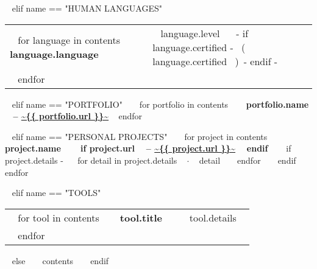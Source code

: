 ~{ elif name == "HUMAN LANGUAGES" }~
  \begin{tabular}{ @{} p{32mm} p{135mm} @{} }
  ~{ for language in contents }~
    \bf {~{{ language.language }}~} & {\small ~{{ language.level }}~ ~{- if language.certified -}~ \small\color{maingrey}\hspace{1mm}(~{{ language.certified }}~)~{- endif -}~} \\
  ~{ endfor }~
  \end{tabular}
  \vspace{50mm}

~{ elif name == "PORTFOLIO" }~
  ~{ for portfolio in contents }~
    {\bf ~{{ portfolio.name }}~ -- \color{maincolor}\url{~{{ portfolio.url }}~} }
    \vspace{1mm}
  ~{ endfor }~
  \vspace{5mm}

~{ elif name == "PERSONAL PROJECTS" }~
  ~{ for project in contents }~
    {\small\bf ~{{ project.name }}~ ~{ if project.url }~ -- \color{maincolor}\url{~{{ project.url }}~} ~{ endif }~ }
    \vspace{1mm}
    ~{ if project.details -}~
    ~{ for detail in project.details }~
      $\cdot$ \small ~{{ detail }}~
    ~{ endfor }~
    ~{ endif }~
    \vspace{3mm}
  ~{ endfor }~
  \vspace{15mm}

~{ elif name == "TOOLS" }~
  \begin{tabular}{ @{} p{32mm} p{135mm} @{} }
  ~{ for tool in contents }~
    \bf\small ~{{ tool.title }}~ & {\small ~{{ tool.details }}~} \\
  ~{ endfor }~
  \end{tabular}
  \vspace{10mm}
~{ else }~
  ~{{ contents }}~
  \bigskip
~{ endif }~

